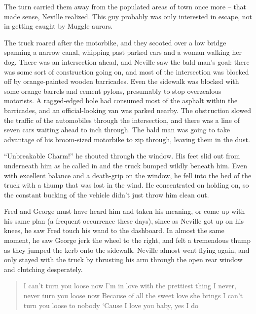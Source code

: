 The turn carried them away from the populated areas of town once more --
that made sense, Neville realized. This guy probably was only interested
in escape, not in getting caught by Muggle aurors.

The truck roared after the motorbike, and they scooted over a low bridge
spanning a narrow canal, whipping past parked cars and a woman walking
her dog. There was an intersection ahead, and Neville saw the bald man's
goal: there was some sort of construction going on, and most of the
intersection was blocked off by orange-painted wooden barricades. Even
the sidewalk was blocked with some orange barrels and cement pylons,
presumably to stop overzealous motorists. A ragged-edged hole had
consumed most of the asphalt within the barricades, and an
official-looking van was parked nearby. The obstruction slowed the
traffic of the automobiles through the intersection, and there was a
line of seven cars waiting ahead to inch through. The bald man was going
to take advantage of his broom-sized motorbike to zip through, leaving
them in the dust.

``Unbreakable Charm!'' he shouted through the window. His feet slid out
from underneath him as he called in and the truck bumped wildly beneath
him. Even with excellent balance and a death-grip on the window, he fell
into the bed of the truck with a thump that was lost in the wind. He
concentrated on holding on, so the constant bucking of the vehicle
didn't just throw him clean out.

Fred and George must have heard him and taken his meaning, or come up
with his same plan (a frequent occurrence these days), since as Neville
got up on his knees, he saw Fred touch his wand to the dashboard. In
almost the same moment, he saw George jerk the wheel to the right, and
felt a tremendous thump as they jumped the kerb onto the sidewalk.
Neville almost went flying again, and only stayed with the truck by
thrusting his arm through the open rear window and clutching
desperately.\\

\begin{quote}
\noindent {} I can't turn you loose now\emph{\hfill\break
}I'm in love with the prettiest thing\emph{\hfill\break
}I never, never turn you loose now\emph{\hfill\break
}Because of all the sweet love she brings\emph{\hfill\break
}I can't turn you loose to nobody\emph{\hfill\break
}`Cause I love you baby, yes I do \\
\end{quote}

